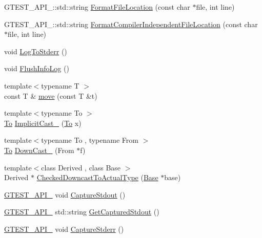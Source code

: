 \begin{DoxyCompactItemize}
\item 
G\+T\+E\+S\+T\+\_\+\+A\+P\+I\+\_\+\+::std\+::string \hyperlink{namespacetesting_1_1internal_a31b7c3abed4a7c395f42c61e993989f4}{Format\+File\+Location} (const char $\ast$file, int line)
\item 
G\+T\+E\+S\+T\+\_\+\+A\+P\+I\+\_\+\+::std\+::string \hyperlink{namespacetesting_1_1internal_a1ee4cde97868c53e442d3182496a9f3c}{Format\+Compiler\+Independent\+File\+Location} (const char $\ast$file, int line)
\item 
void \hyperlink{namespacetesting_1_1internal_a06b1b20029fbd1dbeb59752f914fab84}{Log\+To\+Stderr} ()
\item 
void \hyperlink{namespacetesting_1_1internal_a2135f223bf6b527729aeaa651115183b}{Flush\+Info\+Log} ()
\item 
{\footnotesize template$<$typename T $>$ }\\const T \& \hyperlink{namespacetesting_1_1internal_a0f6d06bf8c3093b9c22bb08723db201e}{move} (const T \&t)
\item 
{\footnotesize template$<$typename To $>$ }\\\hyperlink{classtesting_1_1internal_1_1To}{To} \hyperlink{namespacetesting_1_1internal_a982df3f369643b175f79cda4048bc3b9}{Implicit\+Cast\+\_\+} (\hyperlink{classtesting_1_1internal_1_1To}{To} x)
\item 
{\footnotesize template$<$typename To , typename From $>$ }\\\hyperlink{classtesting_1_1internal_1_1To}{To} \hyperlink{namespacetesting_1_1internal_a1a1a1aed3fe00908b8a45d5ab4a33665}{Down\+Cast\+\_\+} (From $\ast$f)
\item 
{\footnotesize template$<$class Derived , class Base $>$ }\\Derived $\ast$ \hyperlink{namespacetesting_1_1internal_abfe9bfb020d38aa4e0e12c001911b22b}{Checked\+Downcast\+To\+Actual\+Type} (\hyperlink{classBase}{Base} $\ast$base)
\item 
\hyperlink{gtest-port_8h_aa73be6f0ba4a7456180a94904ce17790}{G\+T\+E\+S\+T\+\_\+\+A\+P\+I\+\_\+} void \hyperlink{namespacetesting_1_1internal_acba06d4f0343dec407738ba5544af990}{Capture\+Stdout} ()
\item 
\hyperlink{gtest-port_8h_aa73be6f0ba4a7456180a94904ce17790}{G\+T\+E\+S\+T\+\_\+\+A\+P\+I\+\_\+} std\+::string \hyperlink{namespacetesting_1_1internal_aed657219a9856a8d249a3230de0c54ce}{Get\+Captured\+Stdout} ()
\item 
\hyperlink{gtest-port_8h_aa73be6f0ba4a7456180a94904ce17790}{G\+T\+E\+S\+T\+\_\+\+A\+P\+I\+\_\+} void \hyperlink{namespacetesting_1_1internal_a8ec00d458d0d442bd64af7b5f9c22dda}{Capture\+Stderr} ()

\end{DoxyCompactItemize}

